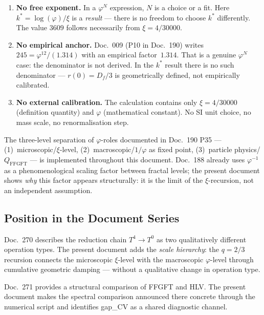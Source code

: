 \begin{enumerate}
  \item \textbf{No free exponent.} In a $\varphi^N$ expression, $N$ is a
        choice or a fit. Here $k^* = \log(\varphi)/\xi$ is a
        \emph{result} --- there is no freedom to choose $k^*$ differently.
        The value $3609$ follows necessarily from $\xi = 4/30000$.

  \item \textbf{No empirical anchor.} Doc.~009 (P10 in Doc.~190) writes
        $245 = \varphi^{12}/(1.314)$ with an empirical factor~$1.314$.
        That is a genuine $\varphi^N$ case: the denominator is not derived.
        In the $k^*$ result there is no such denominator --- $r(0) = D_f/3$
        is geometrically defined, not empirically calibrated.

  \item \textbf{No external calibration.} The calculation contains only
        $\xi = 4/30000$ (definition quantity) and $\varphi$ (mathematical
        constant). No SI unit choice, no mass scale, no renormalisation step.
\end{enumerate}

The three-level separation of $\varphi$-roles documented in Doc.~190 P35 ---
(1)~microscopic/$\xi$-level, (2)~macroscopic/$1/\varphi$ as fixed point,
(3)~particle physics/$Q_\mathrm{FFGFT}$ --- is implemented throughout this
document. Doc.~188 already uses $\varphi^{-1}$ as a phenomenological
scaling factor between fractal levels; the present document shows \emph{why}
this factor appears structurally: it is the limit of the $\xi$-recursion,
not an independent assumption.

\subsection{Position in the Document Series}

Doc.~270 describes the reduction chain $T^4\to T^0$ as two qualitatively
different operation types. The present document adds the \emph{scale
hierarchy}: the $q=2/3$ recursion connects the microscopic $\xi$-level
with the macroscopic $\varphi$-level through cumulative geometric
damping --- without a qualitative change in operation type.

Doc.~271 provides a structural comparison of FFGFT and HLV. The present
document makes the spectral comparison announced there concrete through
the numerical script and identifies gap\_CV as a shared diagnostic channel.

